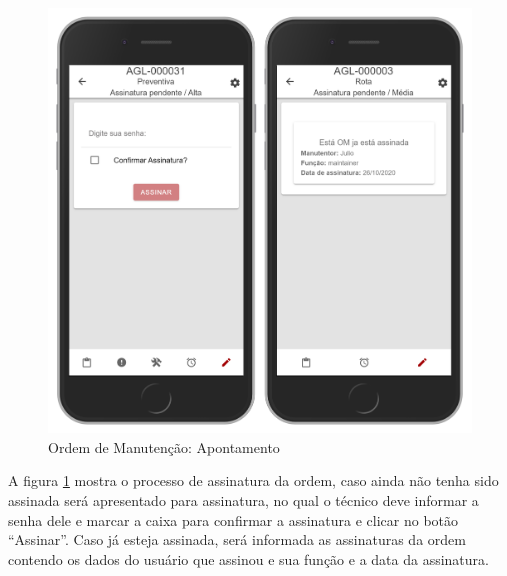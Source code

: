 \begin{figure}[H]
	\caption{\label{mobile-om-assinatura}Ordem de Manutenção: Apontamento}
	\begin{center}
		\includegraphics[scale=0.55]{./Figuras/agil.it/mobile-om-assinatura.jpg}
	\end{center}
\end{figure}

A figura \ref{mobile-om-assinatura} mostra o processo de assinatura da ordem, caso ainda não tenha sido assinada será apresentado para assinatura, no qual o técnico deve informar a senha dele e marcar a caixa para confirmar a assinatura e clicar no botão ``Assinar''. Caso já esteja assinada, será informada as assinaturas da ordem contendo os dados do usuário que assinou e sua função e a data da assinatura.
